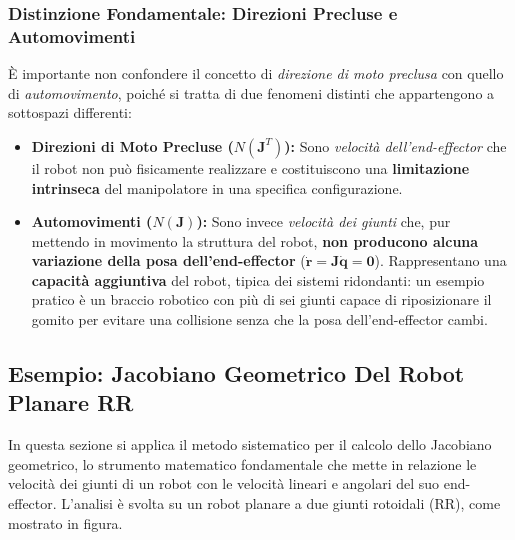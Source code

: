 \documentclass[11pt, a4paper]{report}
\begin{document}
\subsubsection{Distinzione Fondamentale: Direzioni Precluse e Automovimenti}
È importante non confondere il concetto di \textit{direzione di moto preclusa} con quello di \textit{automovimento}, poiché si tratta di due fenomeni distinti che appartengono a sottospazi differenti:

\begin{itemize}
    \item \textbf{Direzioni di Moto Precluse ($N(\bm{J}^T)$):} Sono \textit{velocità dell'end-effector} che il robot non può fisicamente realizzare e costituiscono una \textbf{limitazione intrinseca} del manipolatore in una specifica configurazione.

    \item \textbf{Automovimenti ($N(\bm{J})$):} Sono invece \textit{velocità dei giunti} che, pur mettendo in movimento la struttura del robot, \textbf{non producono alcuna variazione della posa dell'end-effector} ($\dot{\bm{r}} = \bm{J}\dot{\bm{q}} = \bm{0}$). Rappresentano una \textbf{capacità aggiuntiva} del robot, tipica dei sistemi ridondanti: un esempio pratico è un braccio robotico con più di sei giunti capace di riposizionare il gomito per evitare una collisione senza che la posa dell'end-effector cambi.
\end{itemize}


\newpage
\subsection{Esempio: Jacobiano Geometrico Del Robot Planare RR}
In questa sezione si applica il metodo sistematico per il calcolo dello Jacobiano geometrico, lo strumento matematico fondamentale che mette in relazione le velocità dei giunti di un robot con le velocità lineari e angolari del suo end-effector. L'analisi è svolta su un robot planare a due giunti rotoidali (RR), come mostrato in figura.
\end{document}
